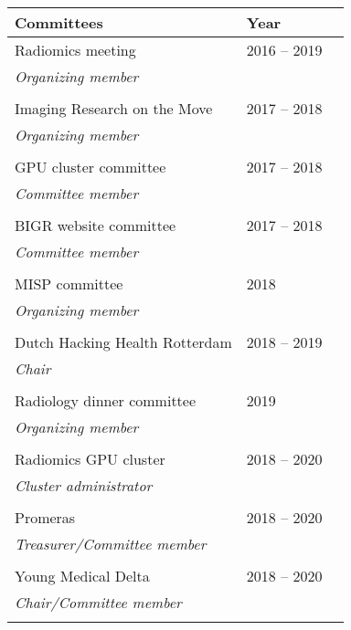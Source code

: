 \vspace*{2cm}
\begin{tabular}{L{8cm}lr}
    \textbf{Committees}&\textbf{Year}\\
    \toprule
    Radiomics meeting& 2016 -- 2019\\
    \textit{Organizing member}\\
    \\
    Imaging Research on the Move& 2017 -- 2018\\
    \textit{Organizing member}\\
    \\
    GPU cluster committee & 2017 -- 2018\\
    \textit{Committee member}\\
    \\
    BIGR website committee & 2017 -- 2018\\
    \textit{Committee member}\\
    \\
    MISP committee & 2018\\
    \textit{Organizing member}\\
    \\
    Dutch Hacking Health Rotterdam & 2018 -- 2019\\
    \textit{Chair}\\
    \\
    Radiology dinner committee & 2019\\
    \textit{Organizing member}\\
    \\
    Radiomics GPU cluster & 2018 -- 2020\\
    \textit{Cluster administrator}\\
    \\
    Promeras & 2018 -- 2020\\
    \textit{Treasurer/Committee member}\\
    \\
    Young Medical Delta & 2018 -- 2020\\
    \textit{Chair/Committee member}\\
    \\
\end{tabular}
